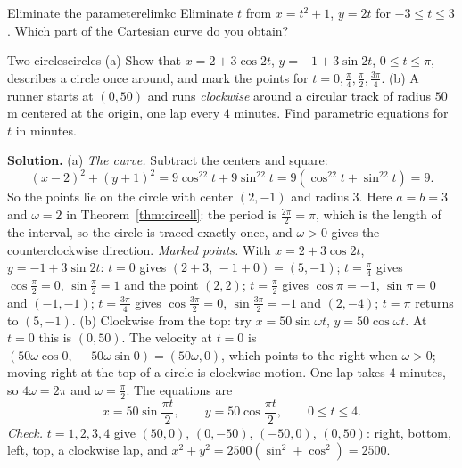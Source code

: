 \documentclass[11pt]{article}
\begin{document}
\begin{kc}{Eliminate the parameter}{elimkc}
Eliminate $t$ from $x=t^2+1$, $y=2t$ for $-3\le t\le3$. Which part of the Cartesian curve do you obtain?
\end{kc}

\begin{exmp}{Two circles}{circles}
(a) Show that $x=2+3\cos2t$, $y=-1+3\sin2t$, $0\le t\le\pi$, describes a circle once around, and mark the points for $t=0,\frac\pi4,\frac\pi2,\frac{3\pi}4$. (b) A runner starts at $(0,50)$ and runs \emph{clockwise} around a circular track of radius $50$ m centered at the origin, one lap every $4$ minutes. Find parametric equations for $t$ in minutes.

\textbf{Solution.} (a) \emph{The curve.} Subtract the centers and square:
\[
(x-2)^2+(y+1)^2=9\cos^22t+9\sin^22t=9\left(\cos^22t+\sin^22t\right)=9.
\]
So the points lie on the circle with center $(2,-1)$ and radius $3$. Here $a=b=3$ and $\omega=2$ in Theorem~\ref{thm:circell}: the period is $\frac{2\pi}2=\pi$, which is the length of the interval, so the circle is traced exactly once, and $\omega>0$ gives the counterclockwise direction. \emph{Marked points.} With $x=2+3\cos2t$, $y=-1+3\sin2t$: $t=0$ gives $(2+3,\,-1+0)=(5,-1)$; $t=\frac\pi4$ gives $\cos\frac\pi2=0$, $\sin\frac\pi2=1$ and the point $(2,2)$; $t=\frac\pi2$ gives $\cos\pi=-1$, $\sin\pi=0$ and $(-1,-1)$; $t=\frac{3\pi}4$ gives $\cos\frac{3\pi}2=0$, $\sin\frac{3\pi}2=-1$ and $(2,-4)$; $t=\pi$ returns to $(5,-1)$.
(b) Clockwise from the top: try $x=50\sin\omega t$, $y=50\cos\omega t$. At $t=0$ this is $(0,50)$. The velocity at $t=0$ is $(50\omega\cos0,\,-50\omega\sin0)=(50\omega,0)$, which points to the right when $\omega>0$; moving right at the top of a circle is clockwise motion. One lap takes $4$ minutes, so $4\omega=2\pi$ and $\omega=\frac\pi2$. The equations are
\[
x=50\sin\frac{\pi t}2,\qquad y=50\cos\frac{\pi t}2,\qquad 0\le t\le4.
\]
\emph{Check.} $t=1,2,3,4$ give $(50,0)$, $(0,-50)$, $(-50,0)$, $(0,50)$: right, bottom, left, top, a clockwise lap, and $x^2+y^2=2500\left(\sin^2+\cos^2\right)=2500$.
\end{exmp}
\end{document}
